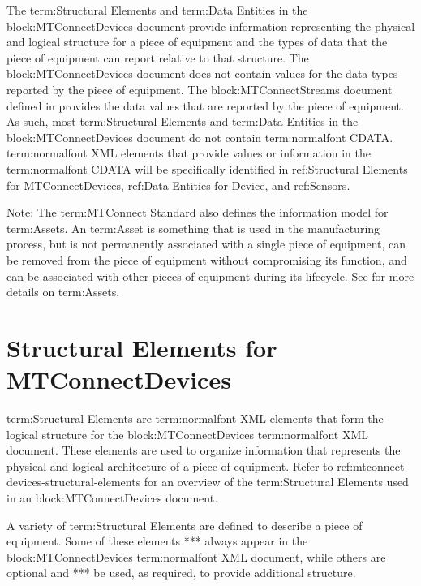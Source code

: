 The {term:Structural Elements} and {term:Data Entities} in the {block:MTConnectDevices} document provide information representing the physical and logical structure for a piece of equipment and the types of data that the piece of equipment can report relative to that structure.   The {block:MTConnectDevices} document does not contain values for the data types reported by the piece of equipment.  The {block:MTConnectStreams} document defined in  provides the data values that are reported by the piece of equipment.   As such, most {term:Structural Elements} and {term:Data Entities} in the {block:MTConnectDevices} document do not contain {term:normalfont CDATA}.  {term:normalfont XML} elements that provide values or information in the {term:normalfont CDATA} will be specifically identified in {ref:Structural Elements for MTConnectDevices}, {ref:Data Entities for Device}, and {ref:Sensors}.

\begin{note}
Note:  The {term:MTConnect Standard} also defines the information model for {term:Assets}.  An {term:Asset} is something that is used in the manufacturing process, but is not permanently associated with a single piece of equipment, can be removed from the piece of equipment without compromising its function, and can be associated with other pieces of equipment during its lifecycle.  See  for more details on {term:Assets}.

\end{note}

\section{Structural Elements for MTConnectDevices}
\label{sec:Structural Elements for MTConnectDevices}
{term:Structural Elements} are {term:normalfont XML} elements that form the logical structure for the {block:MTConnectDevices} {term:normalfont XML} document.  These elements are used to organize information that represents the physical and logical architecture of a piece of equipment.  Refer to {ref:mtconnect-devices-structural-elements} for an overview of the {term:Structural Elements} used in an {block:MTConnectDevices} document.

A variety of {term:Structural Elements} are defined to describe a piece of equipment.  Some of these elements **\MUST** always appear in the {block:MTConnectDevices} {term:normalfont XML} document, while others are optional and **\may** be used, as required, to provide additional structure.

